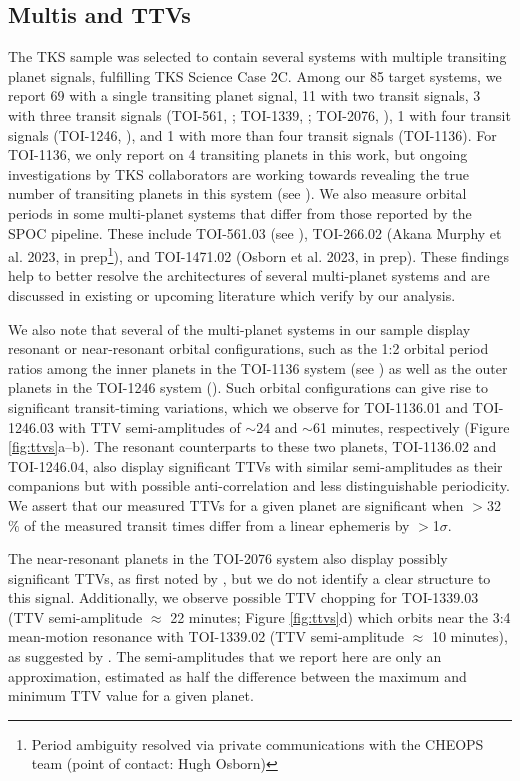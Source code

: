 \documentclass[twocolumn]{aastex63}
\begin{document}
\subsection{Multis and TTVs}
\label{sec:multis}

The TKS sample was selected to contain several systems with multiple transiting planet signals, fulfilling TKS Science Case 2C. Among our 85 target systems, we report 69 with a single transiting planet signal, 11 with two transit signals, 3 with three transit signals (TOI-561, \citealt{Weiss21}; TOI-1339, \citealt{Lubin22}; TOI-2076, \citealt{Osborn22}), 1 with four transit signals (TOI-1246, \citealt{Turtelboom22}), and 1 with more than four transit signals (TOI-1136). For TOI-1136, we only report on 4 transiting planets in this work, but ongoing investigations by TKS collaborators are working towards revealing the true number of transiting planets in this system (see \citealt{Dai22}). We also measure orbital periods in some multi-planet systems that differ from those reported by the SPOC pipeline. These include TOI-561.03 (see \citealt{Lacedelli22}), TOI-266.02 (Akana Murphy et al. 2023, in prep\footnote{Period ambiguity resolved via private communications with the CHEOPS team (point of contact: Hugh Osborn)}), and TOI-1471.02 (Osborn et al. 2023, in prep). These findings help to better resolve the architectures of several multi-planet systems and are discussed in existing or upcoming literature which verify by our analysis.

We also note that several of the multi-planet systems in our sample display resonant or near-resonant orbital configurations, such as the 1:2 orbital period ratios among the inner planets in the TOI-1136 system (see \citealt{Dai22}) as well as the outer planets in the TOI-1246 system (\citealt{Turtelboom22}). Such orbital configurations can give rise to significant transit-timing variations, which we observe for TOI-1136.01 and TOI-1246.03 with TTV semi-amplitudes of $\sim$24 and $\sim$61 minutes, respectively (Figure \ref{fig:ttvs}a--b). The resonant counterparts to these two planets, TOI-1136.02 and TOI-1246.04, also display significant TTVs with similar semi-amplitudes as their companions but with possible anti-correlation and less distinguishable periodicity. We assert that our measured TTVs for a given planet are significant when $>$32$\%$ of the measured transit times differ from a linear ephemeris by $>$1$\sigma$.

The near-resonant planets in the TOI-2076 system also display possibly significant TTVs, as first noted by \cite{Osborn22}, but we do not identify a clear structure to this signal. Additionally, we observe possible TTV chopping for TOI-1339.03 (TTV semi-amplitude $\approx$ 22 minutes; Figure \ref{fig:ttvs}d) which orbits near the 3:4 mean-motion resonance with TOI-1339.02 (TTV semi-amplitude $\approx$ 10 minutes), as suggested by \cite{BadenasAgusti20}. The semi-amplitudes that we report here are only an approximation, estimated as half the difference between the maximum and minimum TTV value for a given planet.
\end{document}
